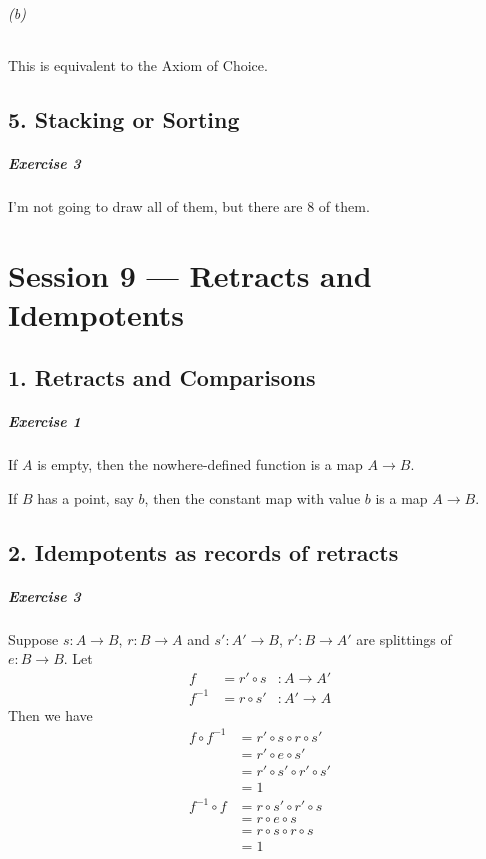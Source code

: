\documentclass{report}
\newcommand{\inv}[1]{\ensuremath{{#1}^{-1}}}
\begin{document}
    \subparagraph{(b)}
    This is equivalent to the Axiom of Choice.

    \section{5. Stacking or Sorting}

    \paragraph{Exercise 3}
    I'm not going to draw all of them, but there are 8 of them.

    \chapter{Session 9 --- Retracts and Idempotents}

    \section{1. Retracts and Comparisons}

    \paragraph{Exercise 1}
    If $A$ is empty, then the nowhere-defined function is a map $A \rightarrow B$.

    If $B$ has a point, say $b$, then the constant map with value $b$ is a map $A \rightarrow B$.

    \section{2. Idempotents as records of retracts}

    \paragraph{Exercise 3}
    Suppose $s : A \rightarrow B$, $r : B \rightarrow A$ and $s' : A' \rightarrow B$, $r' : B \rightarrow A'$
    are splittings of $e : B \rightarrow B$. Let
    \begin{align*}
        f & = r' \circ s & : A \rightarrow A' \\
        \inv{f} & = r \circ s' & : A' \rightarrow A
    \end{align*}
    Then we have
    \begin{align*}
        f \circ \inv{f} & = r' \circ s \circ r \circ s' \\
        & = r' \circ e \circ s' \\
        & = r' \circ s' \circ r' \circ s' \\
        & = 1 \\
        \inv{f} \circ f & = r \circ s' \circ r' \circ s \\
        & = r \circ e \circ s \\
        & = r \circ s \circ r \circ s \\
        & = 1
    \end{align*}
\end{document}
